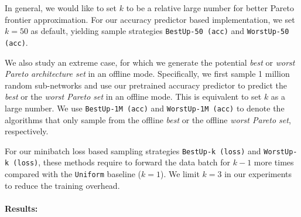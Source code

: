 \documentclass[final]{cvpr}
\theoremstyle{definition}
\begin{document}
In general, we would like to set $k$ to be a relative large number for better 
Pareto frontier approximation. 
For our accuracy predictor based implementation, we set $k=50$ as default, yielding sample strategies \texttt{BestUp-50 (acc)} and \texttt{WorstUp-50 (acc)}.

We also study an extreme case, 
for which we generate the potential \emph{best} or \emph{worst Pareto architecture set} in an offline mode. 
Specifically, we first sample 1 million random sub-networks and use our pretrained accuracy predictor to predict the \emph{best} or the  \emph{worst Pareto set} in an offline mode. 
This is equivalent to set $k$ as a large number. 
We use \texttt{BestUp-1M (acc)} and \texttt{WorstUp-1M (acc)} to denote the algorithms that only sample from the offline \emph{best} or the offline \emph{worst Pareto set}, respectively.  

For our minibatch loss based sampling strategies \texttt{BestUp-k (loss)} and  \texttt{WorstUp-k (loss)}, 
these methods require to forward the data batch for $k-1$ 
more times compared with the \texttt{Uniform} baseline ($k=1$).  
We limit $k=3$ in our experiments to reduce the training overhead. 

\paragraph{Results:} 
\end{document}
